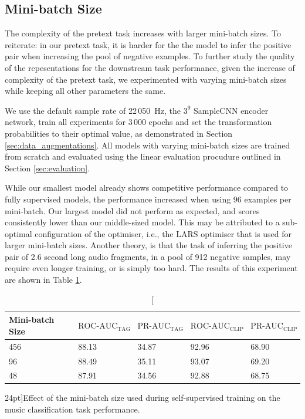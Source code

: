 \subsection{Mini-batch Size}\label{sec:exp_mini_batch_size}
The complexity of the pretext task increases with larger mini-batch sizes. To reiterate: in our pretext task, it is harder for the the model to infer the positive pair when increasing the pool of negative examples.
To further study the quality of the repesentations for the downstream task performance, given the increase of complexity of the pretext task, we experimented with varying mini-batch sizes while keeping all other parameters the same.

We use the default sample rate of 22\,050~Hz, the $3^9$ SampleCNN encoder network, train all experiments for 3\,000 epochs and set the transformation probabilities to their optimal value, as demonstrated in Section \ref{sec:data_augmentations}. All models with varying mini-batch sizes are trained from scratch and evaluated using the linear evaluation procudure outlined in Section \ref{sec:evaluation}.

While our smallest model already shows competitive performance compared to fully supervised models, the performance increased when using 96 examples per mini-batch. Our largest model did not perform as expected, and scores consistently lower than our middle-sized model. This may be attributed to a sub-optimal configuration of the optimiser, i.e., the LARS optimiser that is used for larger mini-batch sizes. Another theory, is that the task of inferring the positive pair of 2.6 second long audio fragments, in a pool of 912 negative samples, may require even longer training, or is simply too hard. The results of this experiment are shown in Table \ref{tab:mini_batch_ablation}.


\begin{table}
    \centering
    \begin{tabular}{lllll}\toprule
    Mini-batch Size & $\text{ROC-AUC}_{\text{TAG}}$ & $\text{PR-AUC}_{\text{TAG}}$ & $\text{ROC-AUC}_{\text{CLIP}}$ & $\text{PR-AUC}_{\text{CLIP}}$ \\\midrule
    456 & 88.13 & 34.87 & 92.96 & 68.90 \\
    96 & 88.49 & 35.11 & 93.07 & 69.20 \\
    48 & 87.91 & 34.56 & 92.88 & 68.75 \\\bottomrule
    \end{tabular}
    \caption[][24pt]{Effect of the mini-batch size used during self-supervised training on the music classification task performance.}
    \label{tab:mini_batch_ablation}
\end{table}

